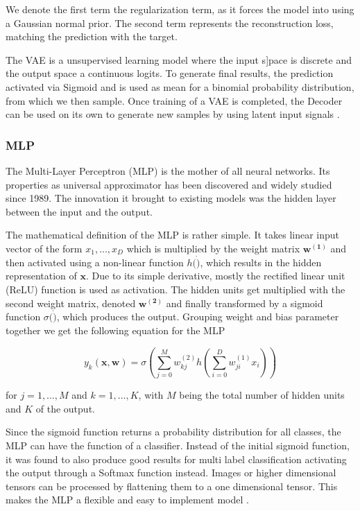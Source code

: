 We denote the first term the regularization term, as it forces the model into using a Gaussian normal prior. The second term represents the reconstruction loss, matching the prediction with the target.

The VAE is a unsupervised learning model where the input s]pace is discrete and the output space a continuous logits. To generate final results, the prediction activated via Sigmoid and is used as mean for a binomial probability distribution, from which we then sample. Once training  of a VAE is completed, the Decoder can be used on its own to generate new samples by using latent input signals \cite{kingma_auto-encoding_2014}.


\subsubsection{MLP}
\label{ssec:mlp}
The Multi-Layer Perceptron (MLP) is the mother of all neural networks.
Its properties as universal approximator has been discovered and widely studied since 1989. The innovation it brought to existing models was the hidden layer between the input and the output.

The mathematical definition of the MLP is rather simple. It takes linear input vector of the form $x_1,...,x_D$ which is multiplied by the weight matrix $\mathbf{w^{(1)}}$ and then activated using a non-linear function $h(\dot)$, which results in the hidden representation of $\mathbf{x}$. Due to its simple derivative, mostly the rectified linear unit (ReLU) function is used as activation. The hidden units get multiplied with the second weight matrix, denoted $\mathbf{w^{(2)}}$ and finally transformed by a sigmoid function $\sigma(\dot)$, which produces the output. Grouping weight and bias parameter together we get the following equation for the MLP

\begin{equation}
    y_{k}(\mathbf{x}, \mathbf{w})=\sigma\left(\sum_{j=0}^{M} w_{k j}^{(2)} h\left(\sum_{i=0}^{D} w_{j i}^{(1)} x_{i}\right)\right)
\end{equation}

for $j=1, \ldots, M$ and $k=1, \ldots, K$, with $M$ being the total number of hidden units and $K$ of the output.

Since the sigmoid function returns a probability distribution for all classes, the MLP can have the function of a classifier. Instead of the initial sigmoid function, it was found to also produce good results for multi label classification activating the output through a Softmax function instead. Images or higher dimensional tensors can be processed by flattening them to a one dimensional tensor. This makes the MLP a flexible and easy to implement model \cite{bishop_pattern_2006}.


